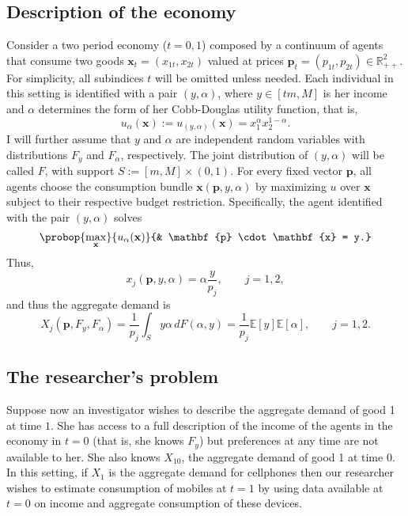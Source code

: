 \documentclass[english, a4paper,12pt]{article}
\begin{document}
\subsection{Description of the economy}
Consider a two period economy ($t = 0,1$) composed by a continuum of agents that consume two goods $\mathbf{x}_{t} = (x_{1t}, x_{2t})$ valued at prices $\mathbf{p}_{t} = (p_{1t}, p_{2t}) \in \mathbb{R}^{2}_{++}$. For simplicity, all subindices $t$ will be omitted unless needed. Each individual in this setting is identified with a pair $(y,\alpha)$, where $y \in [tm,M]$ is her income and $\alpha$ determines the form of her Cobb-Douglas utility function, that is,
	$$u_{\alpha}(\mathbf{x}) := u_{(y,\alpha)}(\mathbf{x}) = x_{1}^{\alpha}x_{2}^{1-\alpha}.$$
I will further assume that $y$ and $\alpha$ are independent random variables with distributions $F_{y}$ and $F_{\alpha}$, respectively. The joint distribution of $(y,\alpha)$ will be called $F$, with support $S := [m,M] \times (0,1)$. For every fixed vector $\mathbf{p}$, all agents choose the consumption bundle $\mathbf{x}(\mathbf{p}, y, \alpha)$ by maximizing $u$ over $\mathbf{x}$ subject to their respective budget restriction. Specifically, the agent identified with the pair $(y,\alpha)$ solves
	$$\probop{\max_{\mathbf{x}}}{u_{\alpha}(\mathbf{x})}
							{&	\mathbf{p} \cdot \mathbf{x} = y.}$$ 
Thus,
	$$x_{j}(\mathbf{p}, y, \alpha) = \alpha \frac{y}{p_{j}}, \qquad j = 1,2,$$
and thus the aggregate demand is
	$$X_{j}(\mathbf{p}, F_{y}, F_{\alpha})
		= \frac{1}{p_{j}} \int_{S} y\alpha \,dF(\alpha,y)
		= \frac{1}{p_{j}}\mathbb{E}[y]\mathbb{E}[\alpha], \qquad j = 1,2.
	$$

\subsection{The researcher's problem}
Suppose now an investigator wishes to describe the aggregate demand of good 1 at time $1$. She has access to a full description of the income of the agents in the economy in $t = 0$ (that is, she knows $F_{y}$) but preferences at any time are not available to her. She also knows $X_{10}$, the aggregate demand of good 1 at time $0$. In this setting, if $X_{1}$ is the aggregate demand for cellphones then our researcher wishes to estimate consumption of mobiles at $t=1$ by using data available at $t=0$ on income and aggregate consumption of these devices.
\end{document}
